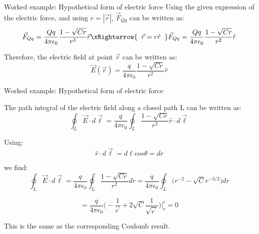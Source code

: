{\begin{frame}{Worked example: Hypothetical form of electric force}
  Using the given expression of the electric force,
  and using $r=|\vec{r}|$,
  $\vec{F}_{Qq}$ can be written as:
  \begin{equation*}
    \displaystyle
    \vec{F}_{Qq} =
      \frac{Qq}{4\pi \epsilon_0}
      \frac{1-\sqrt{Cr}}{r^3} \vec{r}
      \xRightarrow{\;\; \vec{r} = r \hat{r} \;\;}
      \vec{F}_{Qq} =
        \frac{Qq}{4\pi \epsilon_0}
        \frac{1-\sqrt{Cr}}{r^2} \hat{r}
  \end{equation*}

  Therefore, the electric field at point $\vec{r}$ can be written as:
  \begin{equation*}
    \displaystyle
    \vec{E}(\vec{r}) =
        \frac{q}{4\pi \epsilon_0}
        \frac{1-\sqrt{Cr}}{r^2} \hat{r}
  \end{equation*}

\end{frame}

%
%
%

\begin{frame}{Worked example: Hypothetical form of electric force}

  The path integral of the electric field along a closed path L
  can be written as:
  \begin{equation*}
    \oint_{L} \vec{E} \cdot d\vec{\ell} =
       \frac{q}{4\pi \epsilon_0}
         \oint_{L} \frac{1-\sqrt{Cr}}{r^2} \hat{r} \cdot d\vec{\ell}
  \end{equation*}

  Using:
  \begin{equation*}
    \hat{r} \cdot d\vec{\ell} = d\ell cos\theta = dr
  \end{equation*}

  we find:
  \begin{equation*}
    \oint_{L} \vec{E} \cdot d\vec{\ell} =
       \frac{q}{4\pi \epsilon_0}
         \oint_{L} \frac{1-\sqrt{Cr}}{r^2} dr =
        \frac{q}{4\pi \epsilon_0}
           \oint_{L} \Big(r^{-2} - \sqrt{C} r^{-3/2}\Big) dr
  \end{equation*}

  \begin{equation*}
      = \frac{q}{4\pi \epsilon_0}
          \Big(-\frac{1}{r^\prime}+2\sqrt{C}\frac{1}{\sqrt{r^\prime}}\Big)
            \Bigg\rvert_{r}^{r} = 0
  \end{equation*}

  This is the same as the corresponding Coulomb result.

\end{frame}

}
